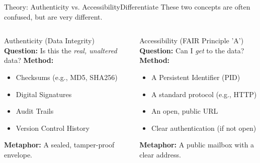 \begin{frame}{Theory: Authenticity vs. Accessibility}{Differentiate}
    These two concepts are often confused, but are very different.
    
    \begin{columns}
        \begin{block}{Authenticity (Data Integrity)}
            \textbf{Question:} Is this the \emph{real, unaltered} data?
            \pause
            \textbf{Method:}
            \begin{itemize}
                \item Checksums (e.g., MD5, SHA256)
                \item Digital Signatures
                \item Audit Trails
                \item Version Control History
            \end{itemize}
            \textbf{Metaphor:} A sealed, tamper-proof envelope.
        \end{block}
        
        \begin{block}{Accessibility (FAIR Principle 'A')}
            \textbf{Question:} Can I \emph{get} to the data?
            \pause
            \textbf{Method:}
            \begin{itemize}
                \item A Persistent Identifier (PID)
                \item A standard protocol (e.g., HTTP)
                \item An open, public URL
                \item Clear authentication (if not open)
            \end{itemize}
            \textbf{Metaphor:} A public mailbox with a clear address.
        \end{block}
    \end{columns}
\end{frame}

